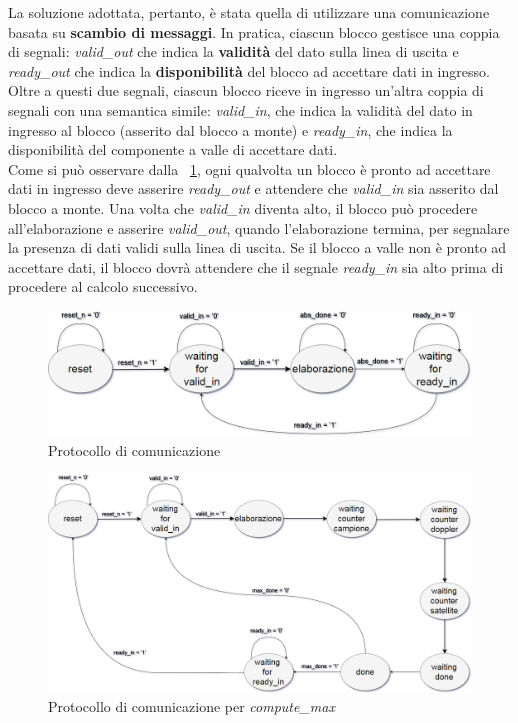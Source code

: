 \documentclass[12pt,a4paper,twoside,openany]{book}
\begin{document}
La soluzione adottata, pertanto, è stata quella di utilizzare una comunicazione basata su \textbf{scambio di messaggi}. In pratica, ciascun blocco gestisce una coppia di segnali: \textit{valid\_out} che indica la \textbf{validità} del dato sulla linea di uscita e \textit{ready\_out} che indica la \textbf{disponibilità} del blocco ad accettare dati in ingresso. Oltre a questi due segnali, ciascun blocco riceve in ingresso un'altra coppia di segnali con una semantica simile: \textit{valid\_in}, che indica la validità del dato in ingresso al blocco (asserito dal blocco a monte) e \textit{ready\_in}, che indica la disponibilità del componente a valle di accettare dati. \\
Come si può osservare dalla \figurename~\ref{wrapperabs_fsm}, ogni qualvolta un blocco è pronto ad accettare dati in ingresso deve asserire \textit{ready\_out} e attendere che \textit{valid\_in} sia asserito dal blocco a monte. Una volta che \textit{valid\_in} diventa alto, il blocco può procedere all'elaborazione e asserire \textit{valid\_out}, quando l'elaborazione termina, per segnalare la presenza di dati validi sulla linea di uscita. Se il blocco a valle non è pronto ad accettare dati, il blocco dovrà attendere che il segnale \textit{ready\_in} sia alto prima di procedere al calcolo successivo.

\begin{figure}
\begin{center}
\includegraphics[scale=0.35, keepaspectratio]{immagini/fsm_wrapper_abs}
\caption{Protocollo di comunicazione}
\label{wrapperabs_fsm}
\end{center}
\end{figure}

\clearpage
\begin{figure}
\begin{center}
\includegraphics[scale=0.28, keepaspectratio]{immagini/fsm_wrapper_max}
\caption{Protocollo di comunicazione per \textit{compute\_max}}
\label{wrappermax_fsm}
\end{center}
\end{figure}
\end{document}
